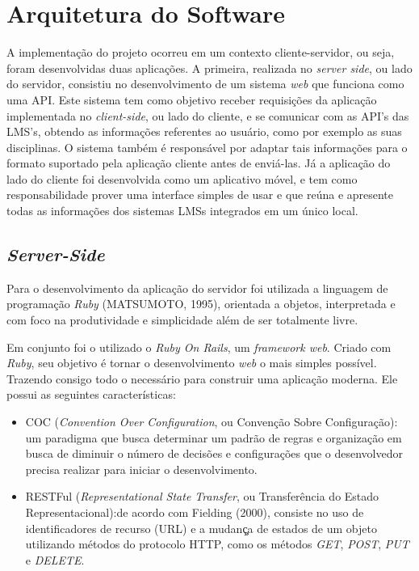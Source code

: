 \chapter{Arquitetura do Software}
\thispagestyle{empty} %

A implementação do projeto ocorreu em um contexto cliente-servidor, ou seja, foram desenvolvidas duas aplicações. A primeira, realizada no \textit{server side}, ou lado do servidor, consistiu no desenvolvimento de um sistema \textit{web} que funciona como uma API. Este sistema tem como objetivo receber requisições da aplicação implementada no \textit{client-side}, ou lado do cliente, e se comunicar com as API's das LMS's, obtendo as informações referentes ao usuário, como por exemplo as suas disciplinas. O sistema também é responsável por adaptar tais informações para o formato suportado pela aplicação cliente antes de enviá-las. Já a aplicação do lado do cliente foi desenvolvida como um aplicativo móvel, e tem como responsabilidade prover uma interface simples de usar e que reúna e apresente todas as informações dos sistemas LMSs integrados em um único local.

\section{\textit{Server-Side}}
							
Para o desenvolvimento da aplicação do servidor foi utilizada a linguagem de programação \textit{Ruby} 
(MATSUMOTO, 1995), orientada a objetos, interpretada e com foco na produtividade e simplicidade além de ser totalmente livre. 

Em conjunto foi o utilizado o \textit{Ruby On Rails}, um \textit{framework web}. Criado com \textit{Ruby}, seu objetivo é tornar o desenvolvimento \textit{web} o mais simples possível. Trazendo consigo todo o necessário para construir uma aplicação moderna. Ele possui as seguintes características:

\begin{itemize}
    \item COC (\textit{Convention Over Configuration}, ou Convenção Sobre Configuração): um paradigma que busca determinar um padrão de regras e organização em busca de diminuir o número de decisões e configurações que o desenvolvedor precisa realizar para iniciar o desenvolvimento.
    
    \item RESTFul (\textit{Representational State Transfer}, ou Transferência do Estado Representacional):de acordo com Fielding (2000), consiste no uso de identificadores de recurso (URL) e a mudanç̧a de estados de um objeto utilizando métodos do protocolo HTTP, como os métodos \textit{GET}, \textit{POST}, \textit{PUT} e \textit{DELETE}.
\end{itemize}

